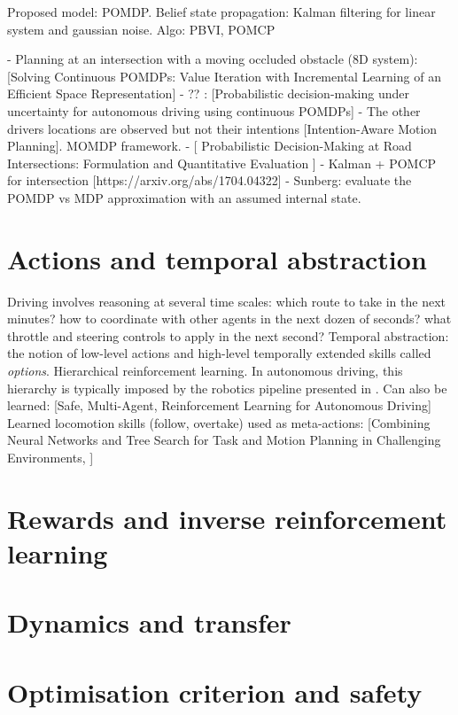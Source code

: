 Proposed model: POMDP.
Belief state propagation: Kalman filtering for linear system and gaussian noise.
Algo: PBVI, POMCP

- Planning at an intersection with a moving occluded obstacle (8D system): [Solving Continuous POMDPs:  Value Iteration with Incremental Learning of an Efficient Space Representation]
- ?? : [Probabilistic decision-making under uncertainty for autonomous driving using continuous POMDPs]
- The other drivers locations are observed but not their intentions [Intention-Aware Motion Planning]. MOMDP framework.
- [ Probabilistic Decision-Making at Road Intersections: Formulation and Quantitative Evaluation ]
- Kalman + POMCP for intersection [https://arxiv.org/abs/1704.04322]
- Sunberg: evaluate the POMDP vs MDP approximation with an assumed internal state.
 

\section{Actions and temporal abstraction}

Driving involves reasoning at several time scales: which route to take in the next minutes? how to coordinate with other agents in the next dozen of seconds? what throttle and steering controls to apply in the next second?
Temporal abstraction: the notion of low-level actions and high-level temporally extended skills called \emph{options}. Hierarchical reinforcement learning.
In autonomous driving, this hierarchy is typically imposed by the robotics pipeline presented in . 
Can also be learned: [Safe, Multi-Agent, Reinforcement Learning for Autonomous Driving]
Learned locomotion skills (follow, overtake) used as meta-actions: [Combining Neural Networks and Tree Search for Task and Motion Planning in Challenging Environments, ]

\section{Rewards and inverse reinforcement learning}
\section{Dynamics and transfer}
\section{Optimisation criterion and safety}
